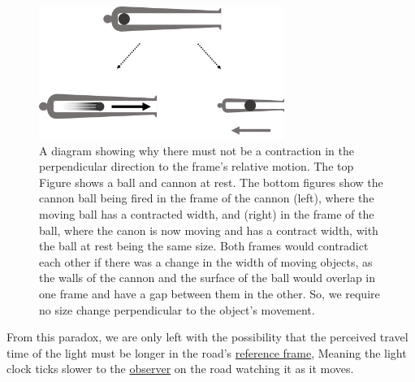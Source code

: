 \begin{figure}[H]
	\centering
	\includegraphics[width = 8cm]{images/pdf/Cannon_Balls.pdf}
	\caption{A diagram showing why there must not be a contraction in the perpendicular direction to the frame's relative motion. The top Figure shows a ball and cannon at rest. The bottom figures show the cannon ball being fired in the frame of the cannon (left), where the moving ball has a contracted width, and (right) in the frame of the ball, where the canon is now moving and has a contract width, with the ball at rest being the same size. Both frames would contradict each other if there was a change in the width of moving objects, as the walls of the cannon and the surface of the ball would overlap in one frame and have a gap between them in the other. So, we require no size change perpendicular to the object's movement.}
	\label{fig: width contraction}
\end{figure}


From this paradox, we are only left with the possibility that the perceived travel time of the light must be longer in the road's \hyperlink{def-Reference-frame}{reference frame}, Meaning the light clock ticks slower to the \hyperlink{def-observer}{observer} on the road watching it as it moves.

